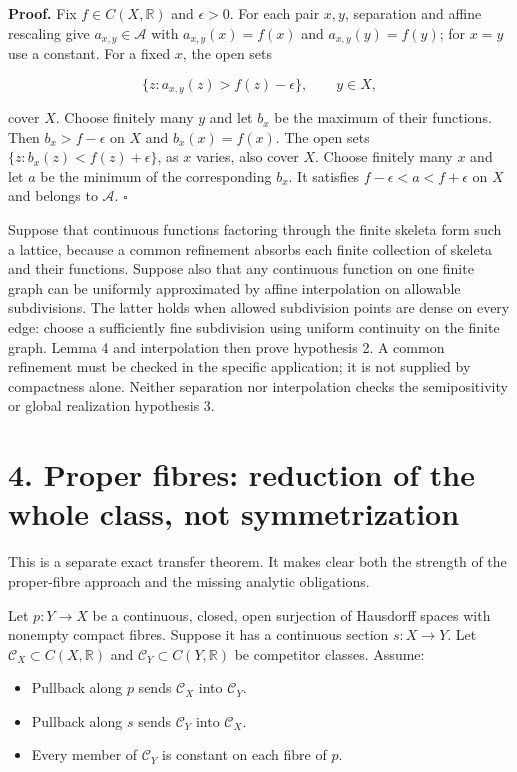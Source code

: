 \documentclass[
  11pt,
]{article}
\providecommand{\tightlist}{%
  \setlength{\itemsep}{0pt}\setlength{\parskip}{0pt}}
\begin{document}
\textbf{Proof.} Fix \(f\in C(X,\mathbb R)\) and \(\epsilon>0\). For each
pair \(x,y\), separation and affine rescaling give
\(a_{x,y}\in\mathcal A\) with \(a_{x,y}(x)=f(x)\) and
\(a_{x,y}(y)=f(y)\); for \(x=y\) use a constant. For a fixed \(x\), the
open sets

\[\{z:a_{x,y}(z)>f(z)-\epsilon\},\qquad y\in X,\]

cover \(X\). Choose finitely many \(y\) and let \(b_x\) be the maximum
of their functions. Then \(b_x>f-\epsilon\) on \(X\) and
\(b_x(x)=f(x)\). The open sets \(\{z:b_x(z)<f(z)+\epsilon\}\), as \(x\)
varies, also cover \(X\). Choose finitely many \(x\) and let \(a\) be
the minimum of the corresponding \(b_x\). It satisfies
\(f-\epsilon<a<f+\epsilon\) on \(X\) and belongs to \(\mathcal A\).
\(\square\)

Suppose that continuous functions factoring through the finite skeleta
form such a lattice, because a common refinement absorbs each finite
collection of skeleta and their functions. Suppose also that any
continuous function on one finite graph can be uniformly approximated by
affine interpolation on allowable subdivisions. The latter holds when
allowed subdivision points are dense on every edge: choose a
sufficiently fine subdivision using uniform continuity on the finite
graph. Lemma 4 and interpolation then prove hypothesis 2. A common
refinement must be checked in the specific application; it is not
supplied by compactness alone. Neither separation nor interpolation
checks the semipositivity or global realization hypothesis 3.

\section{4. Proper fibres: reduction of the whole class, not
symmetrization}\label{proper-fibres-reduction-of-the-whole-class-not-symmetrization}

This is a separate exact transfer theorem. It makes clear both the
strength of the proper-fibre approach and the missing analytic
obligations.

Let \(p:Y\to X\) be a continuous, closed, open surjection of Hausdorff
spaces with nonempty compact fibres. Suppose it has a continuous section
\(s:X\to Y\). Let \(\mathcal C_X\subset C(X,\mathbb R)\) and
\(\mathcal C_Y\subset C(Y,\mathbb R)\) be competitor classes. Assume:

\begin{itemize}
\tightlist
\item
  Pullback along \(p\) sends \(\mathcal C_X\) into \(\mathcal C_Y\).
\item
  Pullback along \(s\) sends \(\mathcal C_Y\) into \(\mathcal C_X\).
\item
  Every member of \(\mathcal C_Y\) is constant on each fibre of \(p\).
\end{itemize}
\end{document}
